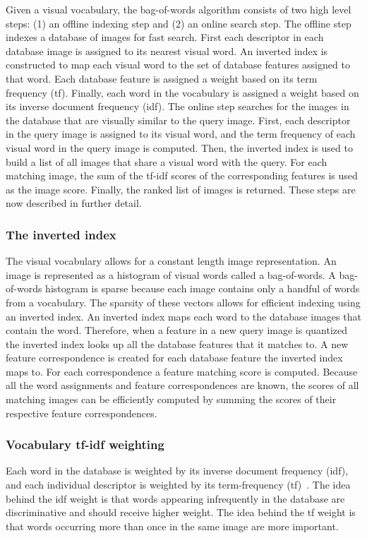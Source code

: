         Given a visual vocabulary, the bag-of-words algorithm consists of two high level steps: (1) an offline
        indexing step and (2) an online search step. The offline step indexes a database of images for fast search.
        First each descriptor in each database image is assigned to its nearest visual word. An inverted index is
        constructed to map each visual word to the set of database features assigned to that word. Each database
        feature is assigned a weight based on its term frequency (tf). Finally, each word in the vocabulary is
        assigned a weight based on its inverse document frequency (idf). The online step searches for the images in
        the database that are visually similar to the query image. First, each descriptor in the query image is
        assigned to its visual word, and the term frequency of each visual word in the query image is computed.
        Then, the inverted index is used to build a list of all images that share a visual word with the query. For
        each matching image, the sum of the tf-idf scores of the corresponding features is used as the image score.
        Finally, the ranked list of images is returned. These steps are now described in further detail.

        \subsubsection{The inverted index}
            The visual vocabulary allows for a constant length image representation. An image is represented as a
            histogram of visual words called a bag-of-words. A bag-of-words histogram is sparse because each image
            contains only a handful of words from a vocabulary. The sparsity of these vectors allows for efficient
            indexing using an inverted index. An inverted index maps each word to the database images that contain
            the word. Therefore, when a feature in a new query image is quantized the inverted index looks up all
            the database features that it matches to. A new feature correspondence is created for each database
            feature the inverted index maps to. For each correspondence a feature matching score is computed.
            Because all the word assignments and feature correspondences are known, the scores of all matching
            images can be efficiently computed by summing the scores of their respective feature correspondences.

        \subsubsection{Vocabulary tf-idf weighting}
            Each word in the database is weighted by its inverse document frequency (idf), and each individual
            descriptor is weighted by its term-frequency (tf)~\cite{sivic_efficient_2009}. The idea behind the idf
            weight is that words appearing infrequently in the database are discriminative and should receive
            higher weight. The idea behind the tf weight is that words occurring more than once in the same image
            are more important.

